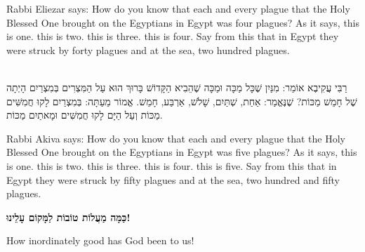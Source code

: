 \begin{english}
Rabbi Eliezar says: How do you know that each and every plague that the Holy Blessed One brought on the Egyptians in Egypt was four plagues? As it says,   this is one.  this is two.  this is three.  this is four. Say from this that in Egypt they were struck by forty plagues and at the sea, two hundred plagues.
\end{english}

\ \\

רַבִּי עֲקִיבֶא אוֹמֵר: מִנַּיִן שֶׁכָּל מַכָּה וּמַכָּה שֶׁהֵבִיא הַקָּדוֹשׁ בָּרוּךְ הוּא עַל הַמִּצְרִים בְּמִצְרַיִם הָיְתָה שֶׁל חָמֵשׁ מַכּוֹת? שֶׁנֶּאֱמַר:
אַחַת,
שְׁתַּיִם,
שָׁלֹשׁ,
אַרְבַּע,
חָמֵשׁ. אֱמוֹר מֵעַתָּה: בְּמִצְרַיִם לָקוּ חֲמִשִּׁים מַכּוֹת וְעַל הַיָּם לָקוּ חֲמִשִּׁים וּמָאתַיִם מַכּוֹת.

\begin{english}
Rabbi Akiva says: How do you know that each and every plague that the Holy Blessed One brought on the Egyptians in Egypt was five plagues? As it says,   this is one.  this is two.  this is three.  this is four.  this is five. Say from this that in Egypt they were struck by fifty plagues and at the sea, two hundred and fifty plagues.
\end{english}

\break

{\bf
כַּמָּה מַעֲלוֹת טוֹבוֹת לַמָּקוֹם עָלֵינוּ!
}

\begin{english}
How inordinately good has God been to us!
\end{english}


